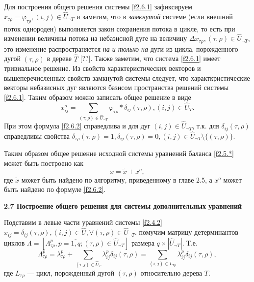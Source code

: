 \documentclass[14pt]{extarticle}%
\begin{document}
Для построения общего решения системы \eqref{f2.6.1} зафиксируем $x_{\tau\rho}=\varphi_{\tau\rho}, (i,j)\in \widehat{U}_{\neg T}$ и заметим, что в {\it замкнутой} системе (если внешний поток однороден) выполняется закон сохранения потока в цикле, то есть при изменении величины потока на небазисной дуге на величину $\Delta x_{\tau\rho}, (\tau,\rho)\in \widehat{U}_{\neg T}$, это изменение распространяется {\it на и только на} дуги из цикла, порожденного дугой $(\tau,\rho)$ в дереве $\widehat{T}$ [??]. Также заметим, что система \eqref{f2.6.1} имеет тривиальное решение. Из свойств характеристических векторов и вышеперечисленных свойств замкнутой системы следует, что характкристические векторы небазисных дуг являются базисом пространства решений системы \eqref{f2.6.1}. Таким образом можно записать общее решение в виде
\begin{equation}\label{f2.6.2}
	x^o_{ij}=\sum_{(\tau,\rho)\in \widehat{U}_{\neg T}}\varphi_{\tau\rho}*\delta_{ij}(\tau,\rho), (i,j)\in \widehat{U}_T.
\end{equation}
При этом формула \eqref{f2.6.2} справедлива и для дуг $(i,j)\in \widehat{U}_{\neg T}$, т.к. для $\delta_{ij}(\tau,\rho)$ справедливы свойства $\delta_{\tau\rho}(\tau,\rho)=1, \delta_{ij}(\tau,\rho)=0, (i,j)\in \widehat{U}_{\neg T}\setminus\{(\tau,\rho)\}$.

Таким образом общее решение исходной системы уравнений баланса \eqref{f2.5.*} может быть построено как 
\begin{equation}\label{f2.6.3}
x=\widetilde x+x^o,
\end{equation}
 где $\widetilde x$ может быть найдено по алгоритму, приведенному в главе 2.5, а $x^o$ может быть найдено по формуле \eqref{f2.6.2}.

\textbf{2.7 Построение общего решения для системы дополнительных уравнений}

Подставим в левые части уравнений системы \eqref{f2.4.2} $x_{ij}=\delta_{ij}(\tau,\rho), (i,j)\in \widehat{U}, \forall (\tau,\rho)\in \widehat{U}_{\neg T}$. помучим матрицу детерминантов циклов $\Lambda=[\Lambda^p_{\tau\rho}, p=\overline{1,q};(\tau,\rho)\in \widehat{U}_{\neg T}]$ размера $q\times |\widehat{U}_{\neg T}|$. Т.е.
\begin{equation}\label{f2.7.1}
	\Lambda^p_{\tau\rho}=\lambda_{\tau\rho}^p+\sum_{(i,j)\in \widehat{U}_T} \lambda_{ij}^p\delta_{ij}(\tau,\rho)=\sum_{(i,j)\in L_{\tau\rho}} \lambda_{ij}^p\delta_{ij}(\tau,\rho),
\end{equation}
где $L_{\tau\rho}$ --- цикл, порожденный дугой $(\tau,\rho)$ относительно дерева $T$.
\end{document}
